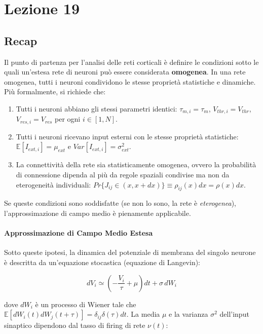 \chapter{Lezione 19}

\section{Recap}

Il punto di partenza per l'analisi delle reti corticali è definire le condizioni sotto le quali un'estesa rete di neuroni può essere considerata \textbf{omogenea}. In una rete omogenea, tutti i neuroni condividono le stesse proprietà statistiche e dinamiche. Più formalmente, si richiede che:
\begin{enumerate}
    \item Tutti i neuroni abbiano gli stessi parametri identici: $\tau_{m,i} = \tau_m$, $V_{thr,i} = V_{thr}$, $V_{res,i} = V_{res}$ per ogni $i \in [1, N]$.
    \item Tutti i neuroni ricevano input esterni con le stesse proprietà statistiche: $\mathbb{E}[I_{ext,i}] = \mu_{ext}$ e $Var[I_{ext,i}] = \sigma_{ext}^2$.
    \item La connettività della rete sia statisticamente omogenea, ovvero la probabilità di connessione dipenda al più da regole spaziali condivise ma non da eterogeneità individuali: $Pr\{J_{ij} \in (x, x+dx)\} \equiv \rho_{ij}(x)dx = \rho(x)dx$.
\end{enumerate}
Se queste condizioni sono soddisfatte (se non lo sono, la rete è \textit{eterogenea}), l'approssimazione di campo medio è pienamente applicabile.

\subsubsection{Approssimazione di Campo Medio Estesa}

Sotto queste ipotesi, la dinamica del potenziale di membrana del singolo neurone è descritta da un'equazione stocastica (equazione di Langevin):

\begin{equation}
dV_i \simeq \left(-\frac{V_i}{\tau} + \mu\right)dt + \sigma \, dW_i
\end{equation}

dove $dW_i$ è un processo di Wiener tale che $\mathbb{E}[dW_i(t)dW_j(t+\tau)] = \delta_{ij}\delta(\tau)dt$. La media $\mu$ e la varianza $\sigma^2$ dell'input sinaptico dipendono dal tasso di firing di rete $\nu(t)$:

